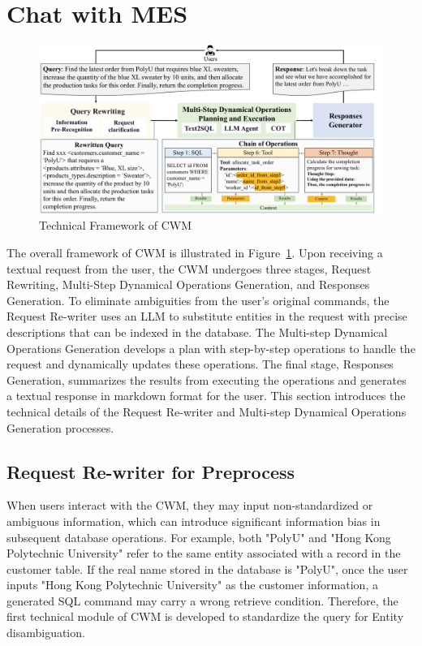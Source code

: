 \documentclass[preprint,12pt]{elsarticle}
\begin{document}
\section{Chat with MES}
\label{sec:method}
\begin{figure}[t]%
\centering%
\includegraphics[width=1.05\linewidth]{figs/flow.pdf}
\caption{Technical Framework of CWM}
\label{fig:cwm_framework}
\end{figure}
The overall framework of CWM is illustrated in Figure~\ref{fig:cwm_framework}.
Upon receiving a textual request from the user, the CWM undergoes three stages, Request Rewriting, Multi-Step Dynamical Operations Generation, and Responses Generation.
To eliminate ambiguities from the user's original commands, the Request Re-writer uses an LLM to substitute entities in the request with precise descriptions that can be indexed in the database.
The Multi-step Dynamical Operations Generation develops a plan with step-by-step operations to handle the request and dynamically updates these operations.
The final stage, Responses Generation, summarizes the results from executing the operations and generates a textual response in markdown format for the user.
This section introduces the technical details of the Request Re-writer and Multi-step Dynamical Operations Generation processes.


\subsection{Request Re-writer for Preprocess}
When users interact with the CWM, they may input non-standardized or ambiguous information, which can introduce significant information bias in subsequent database operations.
For example, both "PolyU" and "Hong Kong Polytechnic University" refer to the same entity associated with a record in the customer table.
If the real name stored in the database is "PolyU", once the user inputs "Hong Kong Polytechnic University" as the customer information, a generated SQL command may carry a wrong retrieve condition.
Therefore, the first technical module of CWM is developed to
standardize the query for Entity disambiguation.
\end{document}
